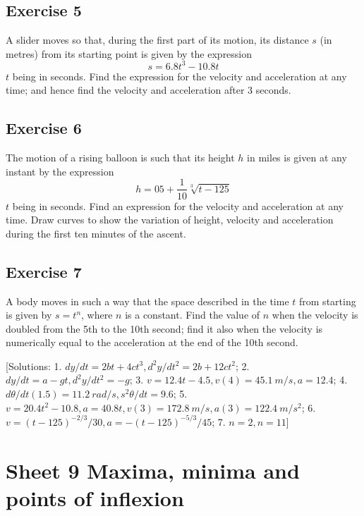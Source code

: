 \documentclass[
  11pt,
  oneside]{book}
\newcommand{\slide}{}
\theoremstyle{definition}
\theoremstyle{definition}
\theoremstyle{definition}
\theoremstyle{definition}
\theoremstyle{remark}
\begin{document}
\slide

\subsection*{Exercise 5}\label{exercise-5-1}

A slider moves so that, during the first part of its motion, its distance \(s\) (in metres) from its starting point is given by the expression
\[
s = 6.8t^3 - 10.8t
\]
\(t\) being in seconds. Find the expression for the velocity and acceleration at any time; and hence find the velocity and acceleration after \(3\) seconds.

\slide

\subsection*{Exercise 6}\label{exercise-6-1}

The motion of a rising balloon is such that its height \(h\) in miles is given at any instant by the expression
\[
h = 05+ \frac1{10}\sqrt[3]{t-125}
\]
\(t\) being in seconds. Find an expression for the velocity and acceleration at any time. Draw curves to show the variation of height, velocity and acceleration during the first ten minutes of the ascent.

\slide

\subsection*{Exercise 7}\label{exercise-7}

A body moves in such a way that the space described in the time \(t\) from starting is given by \(s = t^n\), where \(n\) is a constant. Find the value of \(n\) when the velocity is doubled from the 5th to the 10th second; find it also when the velocity is numerically equal to the acceleration at the end of the 10th second.

{[}Solutions: 1. \(dy/dt=2bt+4ct^3, d^2y/dt^2=2b+12ct^2\); 2. \(dy/dt=a-gt, d^2y/dt^2=-g\); 3. \(v=12.4t-4.5, v(4)=45.1\ m/s, a=12.4\); 4. \(d\theta/dt(1.5)=11.2\ rad/s, s^2\theta/dt = 9.6\); 5. \(v=20.4t^2-10.8, a=40.8t, v(3)=172.8\ m/s, a(3)=122.4\ m/s^2\); 6. \(v=(t-125)^{-2/3}/30, a=-(t-125)^{-5/3}/45\); 7. \(n=2, n=11\){]}

\slide

\section{Sheet 9 Maxima, minima and points of inflexion}\label{sheet-9-maxima-minima-and-points-of-inflexion}
\end{document}
